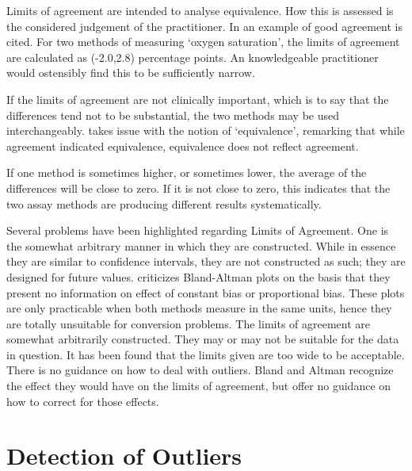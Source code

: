 \documentclass[12pt, a4paper]{report}
\theoremstyle{plain}
\theoremstyle{definition}
\theoremstyle{remark}
\begin{document}
Limits of agreement are intended to analyse equivalence. How this is assessed is the considered judgement of the practitioner. In \citet{BA86} an example of good agreement is cited. For two
methods of measuring `oxygen saturation', the limits of agreement are calculated as (-2.0,2.8) percentage points. An knowledgeable practitioner would ostensibly find
this to be sufficiently narrow.

If the limits of agreement are not clinically important, which is
to say that the differences tend not to be substantial, the two
methods may be used interchangeably. \citet{DunnSEME} takes issue
with the notion of `equivalence', remarking that while agreement
indicated equivalence, equivalence does not reflect agreement.

%
%


If one method is sometimes higher, or sometimes lower, the average of the differences will be close to zero.
If it is not close to zero, this indicates that the two assay methods are producing different results systematically.

Several problems have been highlighted regarding Limits of Agreement. One is the somewhat arbitrary manner in which they are
constructed. While in essence they are similar to confidence intervals, they are not constructed as such; they are designed for future values.
\citet{ludbrook97,ludbrook02} criticizes Bland-Altman plots on the
basis that they present no information on effect of constant bias
or proportional bias. These plots are only practicable when both
methods measure in the same units, hence they are totally
unsuitable for conversion problems. The limits of agreement are
somewhat arbitrarily constructed. They may or may not be suitable
for the data in question. It has been found that the limits given
are too wide to be acceptable. There is no guidance on how to deal
with outliers. Bland and Altman recognize the effect they would have
on the limits of agreement, but offer no guidance on how to
correct for those effects.	


\section{Detection of Outliers}
\end{document}
